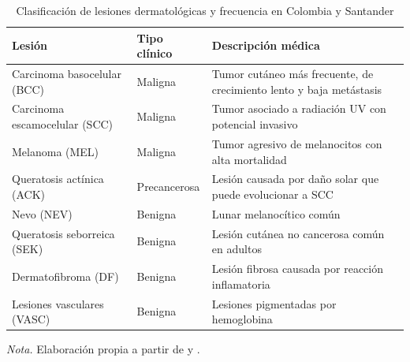 \begin{table}[htbp]
\centering
\small
\setlength{\tabcolsep}{4pt}
\caption{Clasificación de lesiones dermatológicas y frecuencia en Colombia y Santander}
\label{tab:clasificacion-lesiones}
\begin{tabular}{@{}>{\raggedright\arraybackslash}p{}>{\raggedright\arraybackslash}p{}>{\raggedright\arraybackslash}p{}@{}}
\toprule
\textbf{Lesión} & \textbf{Tipo clínico} & \textbf{Descripción médica} \\
\midrule
Carcinoma basocelular (BCC) & Maligna & Tumor cutáneo más frecuente, de crecimiento lento y baja metástasis \\
\addlinespace
Carcinoma escamocelular (SCC) & Maligna & Tumor asociado a radiación UV con potencial invasivo \\
\addlinespace
Melanoma (MEL) & Maligna & Tumor agresivo de melanocitos con alta mortalidad \\
\addlinespace
Queratosis actínica (ACK) & Precancerosa & Lesión causada por daño solar que puede evolucionar a SCC \\
\addlinespace
Nevo (NEV) & Benigna & Lunar melanocítico común \\
\addlinespace
Queratosis seborreica (SEK) & Benigna & Lesión cutánea no cancerosa común en adultos \\
\addlinespace
Dermatofibroma (DF) & Benigna & Lesión fibrosa causada por reacción inflamatoria \\
\addlinespace
Lesiones vasculares (VASC) & Benigna & Lesiones pigmentadas por hemoglobina \\
\bottomrule
\end{tabular}

\vspace{4pt}
\begin{minipage}{\textwidth}
\footnotesize
\textit{Nota.} Elaboración propia a partir de \textcite{tschandl2018ham10000} y \textcite{uribe2018bccbucaramanga}.
\end{minipage}
\end{table}


